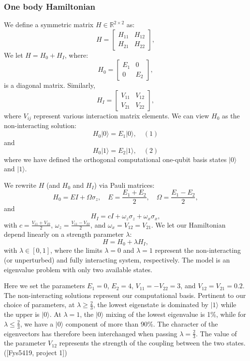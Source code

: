 \documentclass[onecolumn,10pt,cleanfoot]{asme2ej}
\begin{document}
\subsubsection{One body Hamiltonian}
We define a symmetric matrix $H \in \mathbb{R}^{2 \times 2}$ as:
\[
H =
\begin{bmatrix}
H_{11} & H_{12} \\
H_{21} & H_{22}
\end{bmatrix},
\]
We let $H = H_0 + H_I$, where:
\[
H_0 =
\begin{bmatrix}
E_1 & 0 \\
0 & E_2
\end{bmatrix},
\]
is a diagonal matrix. Similarly,
\[
H_I =
\begin{bmatrix}
V_{11} & V_{12} \\
V_{21} & V_{22}
\end{bmatrix},
\]
where $V_{ij}$ represent various interaction matrix elements. We can view $H_0$ as the non-interacting solution:
\[
H_0|0\rangle = E_1|0\rangle, \quad (1)
\]
and
\[
H_0|1\rangle = E_2|1\rangle, \quad (2)
\]
where we have defined the orthogonal computational one-qubit basis states $|0\rangle$ and $|1\rangle$.

We rewrite $H$ (and $H_0$ and $H_I$) via Pauli matrices:
\[
H_0 = E I + \Omega \sigma_z, \quad E = \frac{E_1 + E_2}{2}, \quad \Omega = \frac{E_1 - E_2}{2},
\]
and
\[
H_I = cI + \omega_z \sigma_z + \omega_x \sigma_x,
\]
with $c = \frac{V_{11} + V_{22}}{2}$, $\omega_z = \frac{V_{11} - V_{22}}{2}$, and $\omega_x = V_{12} = V_{21}$. We let our Hamiltonian depend linearly on a strength parameter $\lambda$:
\[
H = H_0 + \lambda H_I,
\]
with $\lambda \in [0, 1]$, where the limits $\lambda = 0$ and $\lambda = 1$ represent the non-interacting (or unperturbed) and fully interacting system, respectively. The model is an eigenvalue problem with only two available states.

Here we set the parameters $E_1 = 0$, $E_2 = 4$, $V_{11} = -V_{22} = 3$, and $V_{12} = V_{21} = 0.2$. The non-interacting solutions represent our computational basis. Pertinent to our choice of parameters, at $\lambda \geq \frac{2}{3}$, the lowest eigenstate is dominated by $|1\rangle$ while the upper is $|0\rangle$. At $\lambda = 1$, the $|0\rangle$ mixing of the lowest eigenvalue is 1\%, while for $\lambda \leq \frac{2}{3}$, we have a $|0\rangle$ component of more than 90\%. The character of the eigenvectors has therefore been interchanged when passing $\lambda = \frac{2}{3}$. The value of the parameter $V_{12}$ represents the strength of the coupling between the two states. ([Fys5419, project 1])
\end{document}
